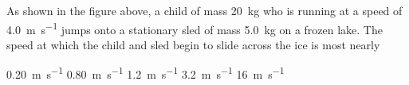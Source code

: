 \documentclass[12pt]{../../oss-apphys-exam}
\begin{document}
\begin{questions}
  
  \question As shown in the figure above, a child of mass \SI{20}{\kilo\gram}
  who is running at a speed of \SI{4.0}{\metre\per\second} jumps onto a
  stationary sled of mass \SI{5.0}{\kilo\gram} on a frozen lake. The speed at
  which the child and sled begin to slide across the ice is most nearly
  \begin{choices}
    \choice \SI{.20}{\metre\per\second}
    \choice \SI{.80}{\metre\per\second}
    \choice \SI{1.2}{\metre\per\second}
    \choice \SI{3.2}{\metre\per\second}
    \choice \SI{16}{\metre\per\second}
  \end{choices}
\end{questions}
\end{document}
